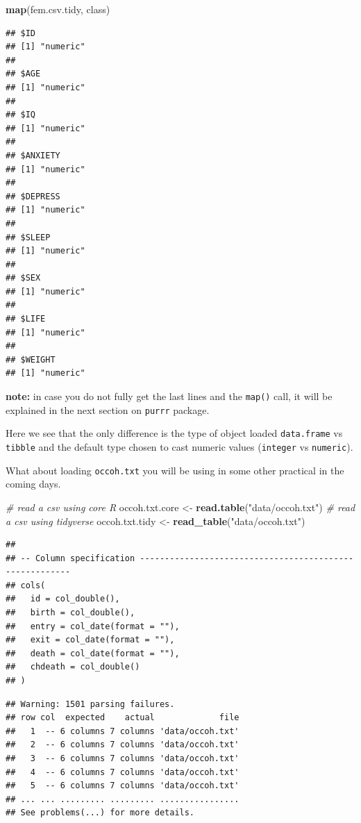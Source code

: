 \documentclass[
]{book}
\newenvironment{Shaded}{\begin{snugshade}}{\end{snugshade}}
\newcommand{\CommentTok}[1]{\textcolor[rgb]{0.56,0.35,0.01}{\textit{#1}}}
\newcommand{\FunctionTok}[1]{\textcolor[rgb]{0.13,0.29,0.53}{\textbf{#1}}}
\newcommand{\NormalTok}[1]{#1}
\newcommand{\OtherTok}[1]{\textcolor[rgb]{0.56,0.35,0.01}{#1}}
\newcommand{\StringTok}[1]{\textcolor[rgb]{0.31,0.60,0.02}{#1}}
\begin{document}
\begin{Shaded}
\begin{Highlighting}[]
\FunctionTok{map}\NormalTok{(fem.csv.tidy, class)}
\end{Highlighting}
\end{Shaded}

\begin{verbatim}
## $ID
## [1] "numeric"
## 
## $AGE
## [1] "numeric"
## 
## $IQ
## [1] "numeric"
## 
## $ANXIETY
## [1] "numeric"
## 
## $DEPRESS
## [1] "numeric"
## 
## $SLEEP
## [1] "numeric"
## 
## $SEX
## [1] "numeric"
## 
## $LIFE
## [1] "numeric"
## 
## $WEIGHT
## [1] "numeric"
\end{verbatim}

\textbf{note:} in case you do not fully get the last lines and the \texttt{map()} call, it will be explained in the next section on \texttt{purrr} package.

Here we see that the only difference is the type of object loaded \texttt{data.frame} vs \texttt{tibble} and the default type chosen to cast numeric values (\texttt{integer} vs \texttt{numeric}).

What about loading \texttt{occoh.txt} you will be using in some other practical in the coming days.

\begin{Shaded}
\begin{Highlighting}[]
\CommentTok{\# read a csv using core R}
\NormalTok{occoh.txt.core }\OtherTok{\textless{}{-}} \FunctionTok{read.table}\NormalTok{(}\StringTok{"data/occoh.txt"}\NormalTok{)}
\CommentTok{\# read a csv using tidyverse}
\NormalTok{occoh.txt.tidy }\OtherTok{\textless{}{-}} \FunctionTok{read\_table}\NormalTok{(}\StringTok{"data/occoh.txt"}\NormalTok{)}
\end{Highlighting}
\end{Shaded}

\begin{verbatim}
## 
## -- Column specification --------------------------------------------------------
## cols(
##   id = col_double(),
##   birth = col_double(),
##   entry = col_date(format = ""),
##   exit = col_date(format = ""),
##   death = col_date(format = ""),
##   chdeath = col_double()
## )
\end{verbatim}

\begin{verbatim}
## Warning: 1501 parsing failures.
## row col  expected    actual             file
##   1  -- 6 columns 7 columns 'data/occoh.txt'
##   2  -- 6 columns 7 columns 'data/occoh.txt'
##   3  -- 6 columns 7 columns 'data/occoh.txt'
##   4  -- 6 columns 7 columns 'data/occoh.txt'
##   5  -- 6 columns 7 columns 'data/occoh.txt'
## ... ... ......... ......... ................
## See problems(...) for more details.
\end{verbatim}
\end{document}
